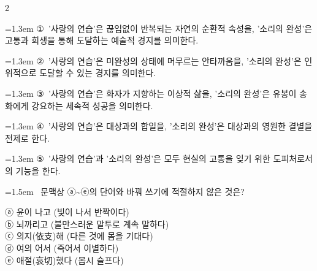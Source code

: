 \documentclass[10pt, a4paper]{article}
\begin{document}
\begin{multicols}{2}
\begin{minipage}{\columnwidth}
\vspace{0.5mm}
{\hangindent=1.3em  \noindent\hspace{0.3em}①~'사랑의 연습'은 끊임없이 반복되는 자연의 순환적 속성을, '소리의 완성'은 고통과 희생을 통해 도달하는 예술적 경지를 의미한다.\par}
{\hangindent=1.3em  \noindent\hspace{0.3em}②~'사랑의 연습'은 미완성의 상태에 머무르는 안타까움을, '소리의 완성'은 인위적으로 도달할 수 있는 경지를 의미한다.\par}
{\hangindent=1.3em  \noindent\hspace{0.3em}③~'사랑의 연습'은 화자가 지향하는 이상적 삶을, '소리의 완성'은 유봉이 송화에게 강요하는 세속적 성공을 의미한다.\par}
{\hangindent=1.3em  \noindent\hspace{0.3em}④~'사랑의 연습'은 대상과의 합일을, '소리의 완성'은 대상과의 영원한 결별을 전제로 한다.\par}
{\hangindent=1.3em  \noindent\hspace{0.3em}⑤~'사랑의 연습'과 '소리의 완성'은 모두 현실의 고통을 잊기 위한 도피처로서의 기능을 한다.\par}
\vspace{4mm}
\end{minipage}
\par

\noindent\begin{minipage}{\columnwidth}
\vspace{2mm}
{\hangindent=1.5em  ~문맥상 ⓐ\textasciitilde{}ⓔ의 단어와 바꿔 쓰기에 적절하지 않은 것은?\par}

\vspace{1mm}
\begin{boxibox}
ⓐ 윤이 나고 (빛이 나서 반짝이다) \\
ⓑ 뇌까리고 (불만스러운 말투로 계속 말하다) \\
ⓒ 의지(依支)해 (다른 것에 몸을 기대다) \\
ⓓ 여의 어서 (죽어서 이별하다) \\
ⓔ 애절(哀切)했다 (몹시 슬프다) \\
\end{boxibox}
\vspace{1mm}


\end{minipage}
\end{multicols}
\end{document}
